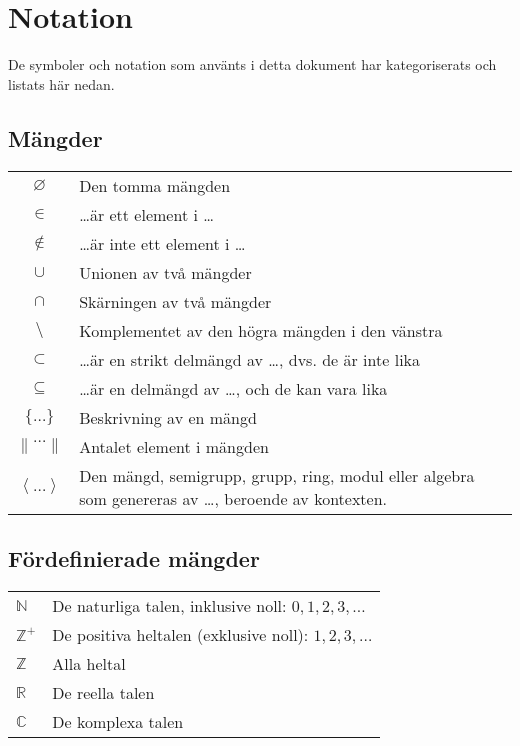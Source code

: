 \chapter{Notation}

De symboler och notation som använts i detta dokument har kategoriserats och listats här nedan.

\section{Mängder}

\begin{tabular}{cp{10.5cm}}
$\varnothing$	& Den tomma mängden \\ 
$\in$	& \ldots är ett element i \ldots \\ 
$\notin$	&  \ldots är inte ett element i \ldots \\ 
$\cup$	& Unionen av två mängder \\ 
$\cap$	&  Skärningen av två mängder \\ 
$\setminus$	&  Komplementet av den högra mängden i den vänstra \\ 
$\subset$	& \ldots är en strikt delmängd av \ldots, dvs. de är inte lika \\ 
$\subseteq$	& \ldots är en delmängd av \ldots, och de kan vara lika \\ 
$\{ \ldots \}$	& Beskrivning av en mängd \\ 
$\left\|  \ldots \right\|$	& Antalet element i mängden \\ 
$\left\langle \ldots \right\rangle $	& Den mängd, semigrupp, grupp, ring, modul eller algebra som genereras av \ldots, beroende av kontexten. \\ 
\end{tabular} 

\section{Fördefinierade mängder}

\begin{tabular}{lp{10.5cm}}
$\mathbb{N}$ & De naturliga talen, inklusive noll: $0, 1, 2, 3, \ldots$ \\
$\mathbb{Z^+}$ & De positiva heltalen (exklusive noll): $1, 2, 3, \ldots$ \\
$\mathbb{Z}$ & Alla heltal \\
$\mathbb{R}$ & De reella talen \\
$\mathbb{C}$ & De komplexa talen
\end{tabular}

